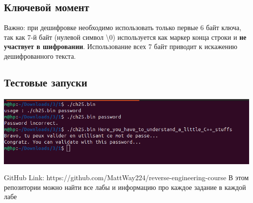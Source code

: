     \subsection{Ключевой момент}

    Важно: при дешифровке необходимо использовать только первые 6 байт ключа, так как 7-й байт (нулевой символ \textbackslash 0) используется как маркер конца строки и \textbf{не участвует в шифровании}. Использование всех 7 байт приводит к искажению дешифрованного текста.

    \subsection{Тестовые запуски}
    \paragraph{}
        \includegraphics[width=1\linewidth]{static/solution_1}

    \begin{thebibliography}{1}
        GitHub Link: https://github.com/MattWay224/reverse-engineering-course
        В этом репозитории можно найти все лабы и информацию про каждое задание в каждой лабе
    \end{thebibliography}

